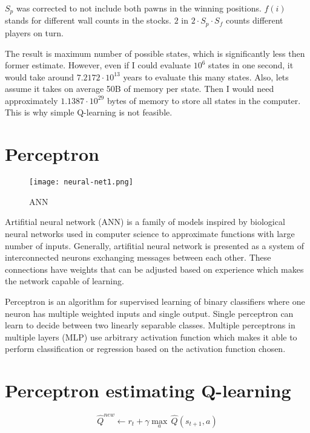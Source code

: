   $S_p$ was corrected to not include both pawns in the winning positions.
  $f(i)$ %
  stands for different wall counts in the stocks.
  $2$ in $2{\cdot} S_p {\cdot} S_f$ counts different players on turn.

  The result is maximum number of possible states, which is significantly
  less then former estimate. However, even if I could evaluate $10^{6}$
  states in one second, it would take around $7.2172{\cdot}10^{13}$ years to
  evaluate this many states. Also, lets assume it takes on average 50B
  of memory per state. Then I would need approximately
  $1.1387{\cdot}10^{29}$ bytes of memory to store all states in the
  computer. This is why simple Q-learning is not feasible.

\section{Perceptron}

  \begin{wrapfigure}{l}{0.4\textwidth}
    \vspace*{-0.45cm}
    \centering
    \texttt{[image: neural-net1.png]}
    \vspace*{-1.45cm}
    \caption{ANN}
    \label{fig:network}
    \vspace*{-1.00cm}
  \end{wrapfigure}

  Artifitial neural network (ANN) is a family of models inspired by biological
  neural networks used in computer science to approximate functions with
  large number of inputs. Generally, artifitial neural network is presented
  as a system of interconnected neurons exchanging messages between each
  other. These connections have weights that can be adjusted based on
  experience which makes the network capable of learning.

  Perceptron is an algorithm for supervised learning of binary classifiers
  where one neuron has multiple weighted inputs and single output. Single
  perceptron can learn to decide between two linearly separable
  classes. Multiple perceptrons in multiple layers (MLP) use arbitrary
  activation function which makes it able to perform classification or
  regression based on the activation function chosen.

\section{Perceptron estimating Q-learning}
  \begin{wrapfigure}{r}{0.42\textwidth}
    \vspace*{-1.15cm}
    \begin{equation}
      \label{eqn:otheloqupdate}
      \hat{Q}^{new}\!\leftarrow\!r_t\!+\!{\gamma}{\max_a}\,\hat{Q}(s_{t+1},\!a)
    \end{equation}
    \vspace*{-0.95cm}
  \end{wrapfigure}

